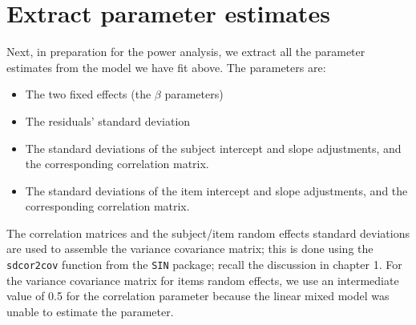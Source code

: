 \documentclass[12pt,]{krantz}
\providecommand{\tightlist}{%
  \setlength{\itemsep}{0pt}\setlength{\parskip}{0pt}}
\begin{document}
\hypertarget{extract-parameter-estimates}{%
\section{Extract parameter estimates}\label{extract-parameter-estimates}}

Next, in preparation for the power analysis, we extract all the parameter estimates from the model we have fit above. The parameters are:

\begin{itemize}
\tightlist
\item
  The two fixed effects (the \(\beta\) parameters)
\item
  The residuals' standard deviation
\item
  The standard deviations of the subject intercept and slope adjustments, and the corresponding correlation matrix.
\item
  The standard deviations of the item intercept and slope adjustments, and the corresponding correlation matrix.
\end{itemize}

The correlation matrices and the subject/item random effects standard deviations are used to assemble the variance covariance matrix; this is done using the \texttt{sdcor2cov} function from the \texttt{SIN} package; recall the discussion in chapter 1. For the variance covariance matrix for items random effects, we use an intermediate value of 0.5 for the correlation parameter because the linear mixed model was unable to estimate the parameter.
\end{document}
